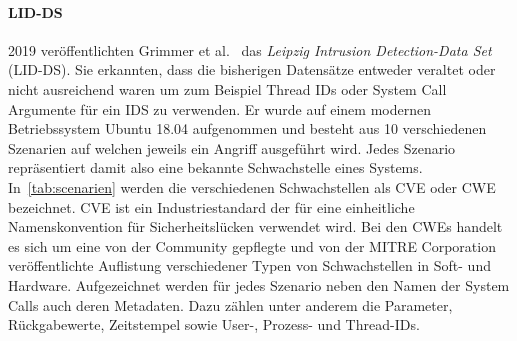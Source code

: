             \paragraph{\ac{LID-DS}}
                2019 veröffentlichten Grimmer et al.~\cite{LIDDS} das \textit{Leipzig Intrusion Detection-Data Set} (\ac{LID-DS}).
                Sie erkannten, dass die bisherigen Datensätze entweder veraltet oder nicht ausreichend waren um zum Beispiel Thread IDs oder System Call Argumente für ein \ac{IDS} zu verwenden.
                Er wurde auf einem modernen Betriebssystem Ubuntu 18.04 aufgenommen und besteht aus 10 verschiedenen Szenarien auf welchen jeweils ein Angriff ausgeführt wird.
                Jedes Szenario repräsentiert damit also eine bekannte Schwachstelle eines Systems.
                In~\autoref{tab:scenarien} werden die verschiedenen Schwachstellen als \ac{CVE}
                 oder \ac{CWE}  bezeichnet.
                CVE ist ein Industriestandard der für eine einheitliche Namenskonvention für Sicherheitslücken verwendet wird.
                Bei den CWEs handelt es sich um eine von der Community gepflegte und von der MITRE Corporation veröffentlichte Auflistung verschiedener Typen von Schwachstellen in Soft- und Hardware.
                Aufgezeichnet werden für jedes Szenario neben den Namen der System Calls auch deren Metadaten.
                Dazu zählen unter anderem die Parameter, Rückgabewerte, Zeitstempel sowie User-, Prozess- und Thread-IDs.
